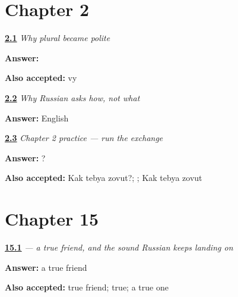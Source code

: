 \section*{Chapter 2}

\noindent\begin{minipage}[t]{\linewidth}
\raggedright
\hyperlink{review-RU-C02-vy-formality-safe-default}{\textbf{2.1}} \emph{Why plural \emph{} became polite}\par
\small \textbf{Answer:} \par
\footnotesize \textbf{Also accepted:} vy
\end{minipage}\par\medskip

\noindent\begin{minipage}[t]{\linewidth}
\raggedright
\hyperlink{review-RU-C02-kak-cross-language-what-language}{\textbf{2.2}} \emph{Why Russian asks \emph{how}, not \emph{what}}\par
\small \textbf{Answer:} English\par
\end{minipage}\par\medskip

\noindent\begin{minipage}[t]{\linewidth}
\raggedright
\hyperlink{review-RU-C02-practice-informal-question}{\textbf{2.3}} \emph{Chapter 2 practice — run the exchange}\par
\small \textbf{Answer:}   ?\par
\footnotesize \textbf{Also accepted:} Kak tebya zovut?;   ; Kak tebya zovut
\end{minipage}\par\medskip

\section*{Chapter 15}

\noindent\begin{minipage}[t]{\linewidth}
\raggedright
\hyperlink{review-RU-W07-a-kind}{\textbf{15.1}} \emph{ — a true friend, and the sound Russian keeps landing on}\par
\small \textbf{Answer:} a true friend\par
\footnotesize \textbf{Also accepted:} true friend; true; a true one
\end{minipage}\par\medskip

